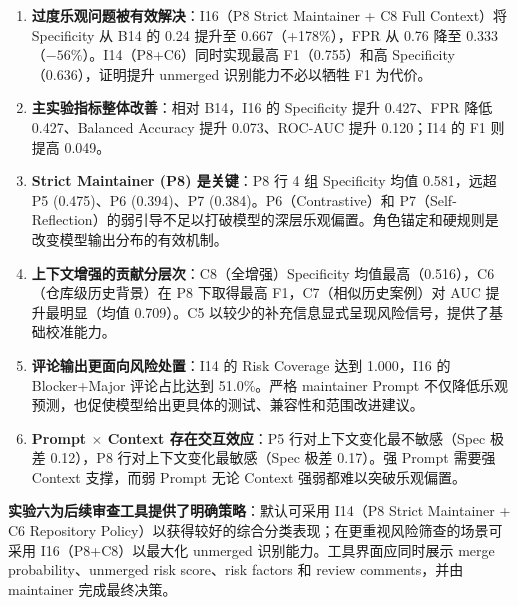 \documentclass{experimentreport}
\begin{document}
\begin{enumerate}
    \item \textbf{过度乐观问题被有效解决}：I16（P8 Strict Maintainer + C8 Full Context）将 Specificity 从 B14 的 0.24 提升至 0.667（+178\%），FPR 从 0.76 降至 0.333（$-56\%$）。I14（P8+C6）同时实现最高 F1（0.755）和高 Specificity（0.636），证明提升 unmerged 识别能力不必以牺牲 F1 为代价。

    \item \textbf{主实验指标整体改善}：相对 B14，I16 的 Specificity 提升 0.427、FPR 降低 0.427、Balanced Accuracy 提升 0.073、ROC-AUC 提升 0.120；I14 的 F1 则提高 0.049。

    \item \textbf{Strict Maintainer (P8) 是关键}：P8 行 4 组 Specificity 均值 0.581，远超 P5 (0.475)、P6 (0.394)、P7 (0.384)。P6（Contrastive）和 P7（Self-Reflection）的弱引导不足以打破模型的深层乐观偏置。角色锚定和硬规则是改变模型输出分布的有效机制。

    \item \textbf{上下文增强的贡献分层次}：C8（全增强）Specificity 均值最高（0.516），C6（仓库级历史背景）在 P8 下取得最高 F1，C7（相似历史案例）对 AUC 提升最明显（均值 0.709）。C5 以较少的补充信息显式呈现风险信号，提供了基础校准能力。

    \item \textbf{评论输出更面向风险处置}：I14 的 Risk Coverage 达到 1.000，I16 的 Blocker+Major 评论占比达到 51.0\%。严格 maintainer Prompt 不仅降低乐观预测，也促使模型给出更具体的测试、兼容性和范围改进建议。

    \item \textbf{Prompt $\times$ Context 存在交互效应}：P5 行对上下文变化最不敏感（Spec 极差 0.12），P8 行对上下文变化最敏感（Spec 极差 0.17）。强 Prompt 需要强 Context 支撑，而弱 Prompt 无论 Context 强弱都难以突破乐观偏置。
\end{enumerate}

\textbf{实验六为后续审查工具提供了明确策略}：默认可采用 I14（P8 Strict Maintainer + C6 Repository Policy）以获得较好的综合分类表现；在更重视风险筛查的场景可采用 I16（P8+C8）以最大化 unmerged 识别能力。工具界面应同时展示 merge probability、unmerged risk score、risk factors 和 review comments，并由 maintainer 完成最终决策。
\end{document}
